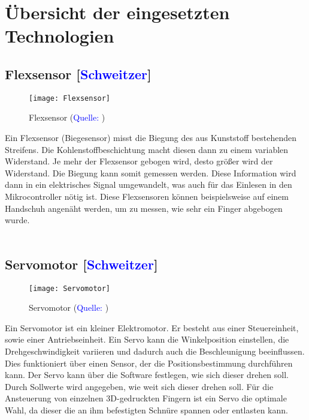 \documentclass[titlepage,12pt,twoside]{article}
\begin{document}
\newpage
\section{Übersicht der eingesetzten Technologien}
\label{chap:Theoretische Grundlagen des Diplomprojekts}

\subsection{Flexsensor [\textcolor{blue}{Schweitzer}]}
\label{chap:Flexsensor}
\begin{figure}[H]
	\begin{center}
		\scalebox{0.6}
		{\texttt{[image: Flexsensor]}}
		\caption{Flexsensor (\textcolor{blue}{Quelle: \cite{Flexsensorabbildung}})}
		\label{fig:Flexsensor}
	\end{center}
\end{figure}
\hfill \break
Ein Flexsensor (Biegesensor) misst die Biegung des aus Kunststoff bestehenden 
Streifens. Die Kohlenstoffbeschichtung macht diesen dann zu einem variablen 
Widerstand. Je mehr der Flexsensor gebogen wird, desto größer wird der Widerstand. 
Die Biegung kann somit gemessen werden. Diese Information wird dann in ein 
elektrisches Signal umgewandelt, was auch für das Einlesen in den Mikrocontroller 
nötig ist. Diese Flexsensoren können beispielsweise auf einem Handschuh angenäht 
werden, um zu messen, wie sehr ein Finger abgebogen wurde. \\
\\

\subsection{Servomotor [\textcolor{blue}{Schweitzer}]}
\label{chap:Servomotor}
\begin{figure}[H]
	\begin{center}
		\scalebox{0.6}
		{\texttt{[image: Servomotor]}}
		\caption{Servomotor (\textcolor{blue}{Quelle: \cite{Servoabbildung}})}
		\label{fig:Servomotor}
	\end{center}
\end{figure}
\hfill \break
Ein Servomotor ist ein kleiner Elektromotor. Er besteht aus einer Steuereinheit, 
sowie einer Antriebseinheit. Ein Servo kann die Winkelposition einstellen, die 
Drehgeschwindigkeit variieren und dadurch auch die Beschleunigung beeinflussen. 
Dies funktioniert über einen Sensor, der die Positionsbestimmung durchführen kann. 
Der Servo kann über die Software festlegen, wie sich dieser drehen soll. Durch 
Sollwerte wird angegeben, wie weit sich dieser drehen soll. Für die Ansteuerung 
von einzelnen 3D-gedruckten Fingern ist ein Servo die optimale Wahl, da dieser 
die an ihm befestigten Schnüre spannen oder entlasten kann. \\
\\
\end{document}

